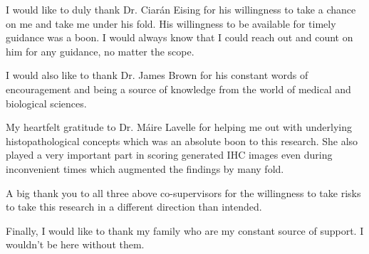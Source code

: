 

\begin{acknowledgements}      %

I would like to duly thank  Dr. Ciarán Eising for his willingness to take a chance on me and take me under his fold. His willingness to be available for timely guidance was a boon. I would always know that I could reach out and count on him for any guidance, no matter the scope.

I would also like to thank Dr. James Brown for his constant words of encouragement and being a source of knowledge from the world of medical and biological sciences.

 My heartfelt gratitude to Dr. Máire Lavelle for helping me out with underlying histopathological concepts which was an absolute boon to this research. She also played a very important part in scoring generated IHC images even during inconvenient times which augmented the findings by many fold.

A big thank you to all three above co-supervisors for the willingness to take risks to take this research in a different direction than intended.

Finally, I would like to thank my family who are my constant source of support. I wouldn't be here without them.


\end{acknowledgements}




